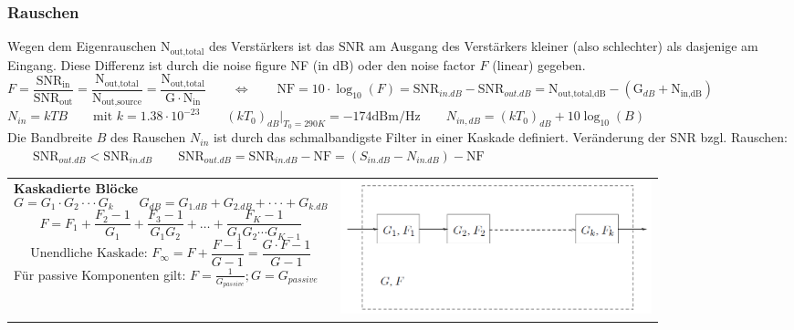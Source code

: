 \subsubsection{Rauschen }
Wegen dem Eigenrauschen $\text{N}_{\text{out,total}}$ des Verstärkers ist das
$\text{SNR}$ am Ausgang des Verstärkers kleiner (also schlechter) als dasjenige am Eingang. Diese Differenz ist durch die noise figure NF (in dB)
oder den noise factor $F$ (linear) gegeben.
\vspace{0.1cm}\\
$ \boxed{F = \dfrac{\text{SNR}_{\text{in}}}{\text{SNR}_{\text{out}}} = 
\dfrac{\text{N}_{\text{out,total}}}{\text{N}_{\text{out,source}}}=
\dfrac{\text{N}_{\text{out,total}}}{\text{G}\cdot \text{N}_{\text{in}}}}
\qquad \Longleftrightarrow \qquad \boxed{\text{NF} = 10 \cdot \log_{10} (F) =
\text{SNR}_{in.dB} - \text{SNR}_{out.dB} =
\text{N}_{\text{out,total,dB}}-(\text{G}_{dB}+ \text{N}_{\text{in,dB}})}$
\vspace{0.1cm}\\
$ N_{in} = k T B \qquad \text{mit } k = 1.38 \cdot
10^{-23} \qquad (k T_0)_{dB} |_{T_0 = 290K} = -174 \text{dBm/Hz} \qquad
N_{in,dB} = (k T_0)_{dB} + 10 \log_{10} (B)$ \\
\vspace{0.1cm}
Die Bandbreite $B$ des Rauschen
$N_{in}$ ist durch das schmalbandigste Filter in einer Kaskade definiert.
\vspace{0.2cm}
Veränderung der SNR bzgl. Rauschen: $\qquad \text{SNR}_{out.dB} <
\text{SNR}_{in.dB} \qquad \text{SNR}_{out.dB} = \text{SNR}_{in.dB} - \text{NF}
= (S_{in.dB} - N_{in.dB}) - \text{NF}$

\begin{tabular}{ll}
\parbox{9cm}{
    \textbf{Kaskadierte Blöcke } \\
    $$G = G_1 \cdot G_2 \cdot \cdot \cdot G_k \qquad G_{dB} = G_{1.dB} + G_{2.dB} + \cdot \cdot
    \cdot + G_{k.dB}$$ 
    $$F=F_1+\dfrac{F_2-1}{G_1}+ \dfrac{F_3-1}{G_1G_2}+\ldots 
       + \dfrac{F_K-1}{G_1G_2\cdots G_{K-1}}$$ 
       $$\text{Unendliche Kaskade: }F_{\infty} = F + \dfrac{F-1}{G-1} =
       \dfrac{G \cdot F-1}{G-1}$$ Für passive Komponenten gilt: $F =
       \frac{1}{G_{passive}}; G = G_{passive}$ }
& \parbox{9cm}{        
        \includegraphics[width=9cm]{./bilder/components_amplifier_noise_cascade.png}
        }\\
\end{tabular}\\

